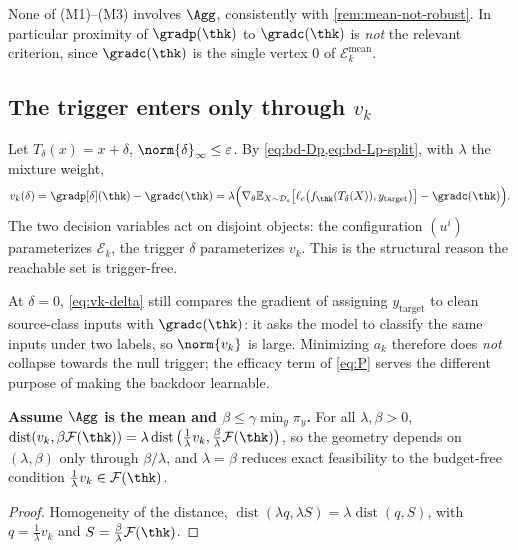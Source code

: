 None of (M1)--(M3) involves $\Agg$, consistently with \cref{rem:mean-not-robust}. In particular proximity of $\gradp(\thk)$ to $\gradc(\thk)$ is \emph{not} the relevant criterion, since $\gradc(\thk)$ is the single vertex $0$ of $\mathcal{E}_k^{\mathrm{mean}}$.


\subsection{The trigger enters only through $v_k$}
\label{sec:trigger-vk}

Let $T_\delta(x)=x+\delta$, $\norm{\delta}_\infty\le\varepsilon$. By \cref{eq:bd-Dp,eq:bd-Lp-split}, with $\lambda$ the mixture weight,
\begin{equation}
v_k(\delta)=\gradp[\delta](\thk)-\gradc(\thk)
=\lambda\Big(\nabla_\theta\mathbb{E}_{X\sim\mathcal D_s}\big[\ell_c\big(f_{\thk}(T_\delta(X)),y_{\mathrm{target}}\big)\big]-\gradc(\thk)\Big).
\label{eq:vk-delta}
\end{equation}
The two decision variables act on disjoint objects: the configuration $(u^i)$ parameterizes $\mathcal{E}_k$, the trigger $\delta$ parameterizes $v_k$. This is the structural reason the reachable set is trigger-free.

\begin{remark}[$v_k$ does not vanish at $\delta=0$]
\label{rem:no-collapse}
At $\delta=0$, \cref{eq:vk-delta} still compares the gradient of assigning $y_{\mathrm{target}}$ to clean source-class inputs with $\gradc(\thk)$: it asks the model to classify the same inputs under two labels, so $\norm{v_k}$ is large. Minimizing $a_k$ therefore does \emph{not} collapse towards the null trigger; the efficacy term of \cref{eq:P} serves the different purpose of making the backdoor learnable.
\end{remark}

\begin{proposition}
\label{prop:budget-match}
\textbf{Assume $\Agg$ is the mean and $\beta\le\gamma\min_y\pi_y$.} For all $\lambda,\beta>0$,
$\operatorname{dist}(v_k,\beta\mathcal{F}(\thk))=\lambda\operatorname{dist}\big(\tfrac1\lambda v_k,\tfrac\beta\lambda\mathcal{F}(\thk)\big)$,
so the geometry depends on $(\lambda,\beta)$ only through $\beta/\lambda$, and $\lambda=\beta$ reduces exact feasibility to the budget-free condition $\tfrac1\lambda v_k\in\mathcal{F}(\thk)$.
\end{proposition}
\begin{proof}
Homogeneity of the distance, $\operatorname{dist}(\lambda q,\lambda S)=\lambda\operatorname{dist}(q,S)$, with $q=\tfrac1\lambda v_k$ and $S=\tfrac\beta\lambda\mathcal{F}(\thk)$.
\end{proof}

